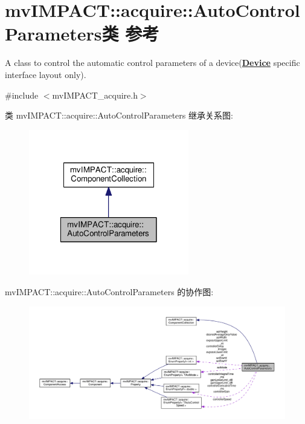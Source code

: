 \hypertarget{classmv_i_m_p_a_c_t_1_1acquire_1_1_auto_control_parameters}{\section{mv\+I\+M\+P\+A\+C\+T\+:\+:acquire\+:\+:Auto\+Control\+Parameters类 参考}
\label{classmv_i_m_p_a_c_t_1_1acquire_1_1_auto_control_parameters}
}


A class to control the automatic control parameters of a device({\bfseries \hyperlink{classmv_i_m_p_a_c_t_1_1acquire_1_1_device}{Device}} specific interface layout only).  




{\ttfamily \#include $<$mv\+I\+M\+P\+A\+C\+T\+\_\+acquire.\+h$>$}



类 mv\+I\+M\+P\+A\+C\+T\+:\+:acquire\+:\+:Auto\+Control\+Parameters 继承关系图\+:
\nopagebreak
\begin{figure}[H]
\begin{center}
\leavevmode
\includegraphics[width=198pt]{classmv_i_m_p_a_c_t_1_1acquire_1_1_auto_control_parameters__inherit__graph}
\end{center}
\end{figure}


mv\+I\+M\+P\+A\+C\+T\+:\+:acquire\+:\+:Auto\+Control\+Parameters 的协作图\+:
\nopagebreak
\begin{figure}[H]
\begin{center}
\leavevmode
\includegraphics[width=350pt]{classmv_i_m_p_a_c_t_1_1acquire_1_1_auto_control_parameters__coll__graph}
\end{center}
\end{figure}
